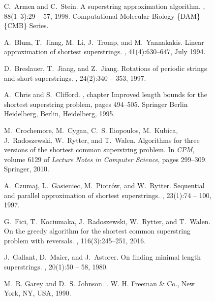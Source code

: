 \documentclass[10pt]{article}
\begin{document}
\begin{figure}[t]
\begin{centering}
{\small 
\begin{thebibliography}{10}

C.~Armen and C.~Stein.
\newblock A  superstring approximation algorithm.
, 88(1–3):29 -- 57, 1998.
\newblock Computational Molecular Biology \{DAM\} - \{CMB\} Series.

A.~Blum, T.~Jiang, M.~Li, J.~Tromp, and M.~Yannakakis.
\newblock Linear approximation of shortest superstrings.
, 41(4):630--647, July 1994.

D.~Breslauer, T.~Jiang, and Z.~Jiang.
\newblock Rotations of periodic strings and short superstrings.
, 24(2):340 -- 353, 1997.

A.~Chris and S.~Clifford.
, chapter Improved
  length bounds for the shortest superstring problem, pages 494--505.
\newblock Springer Berlin Heidelberg, Berlin, Heidelberg, 1995.

M.~Crochemore, M.~Cygan, C.~S. Iliopoulos, M.~Kubica, J.~Radoszewski,
  W.~Rytter, and T.~Walen.
\newblock Algorithms for three versions of the shortest common superstring
  problem.
\newblock In {\em {CPM}}, volume 6129 of {\em Lecture Notes in Computer
  Science}, pages 299--309. Springer, 2010.

A.~Czumaj, L.~Gasieniec, M.~Piotr\'ow, and W.~Rytter.
\newblock Sequential and parallel approximation of shortest superstrings.
, 23(1):74 -- 100, 1997.

G.~Fici, T.~Kociumaka, J.~Radoszewski, W.~Rytter, and T.~Walen.
\newblock On the greedy algorithm for the shortest common superstring problem
  with reversals.
, 116(3):245--251, 2016.

J.~Gallant, D.~Maier, and J.~Astorer.
\newblock On finding minimal length superstrings.
, 20(1):50 -- 58, 1980.

M.~R. Garey and D.~S. Johnson.
.
\newblock W. H. Freeman \& Co., New York, NY, USA, 1990.


\end{thebibliography}}
\end{centering}
\end{figure}
\end{document}
